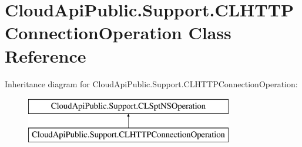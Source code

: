 \hypertarget{class_cloud_api_public_1_1_support_1_1_c_l_h_t_t_p_connection_operation}{\section{Cloud\-Api\-Public.\-Support.\-C\-L\-H\-T\-T\-P\-Connection\-Operation Class Reference}
\label{class_cloud_api_public_1_1_support_1_1_c_l_h_t_t_p_connection_operation}
}
Inheritance diagram for Cloud\-Api\-Public.\-Support.\-C\-L\-H\-T\-T\-P\-Connection\-Operation\-:\begin{figure}[H]
\begin{center}
\leavevmode
\includegraphics[height=2.000000cm]{class_cloud_api_public_1_1_support_1_1_c_l_h_t_t_p_connection_operation}
\end{center}
\end{figure}
